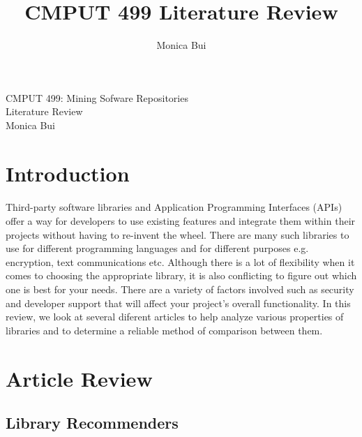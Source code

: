 \documentclass[12pt]{article}
\title{CMPUT 499 Literature Review}
\author{Monica Bui}
\begin{document}
\begin{titlepage}
    \centering
    \large
    \vspace{1cm}
    CMPUT 499: Mining Sofware Repositories \\
    \vspace{1cm}
    Literature Review \\
    \vspace{1cm}
    Monica Bui
\end{titlepage}



\newpage
\section{Introduction}

\paragraph{}
Third-party software libraries and Application Programming Interfaces (APIs) offer a way for developers
to use existing features and integrate them within their projects without having to re-invent the wheel.
There are many such libraries to use for different programming languages and for different purposes e.g. encryption, text communications etc.
Although there is a lot of flexibility when it comes to choosing the appropriate library,
it is also conflicting to figure out which one is best for your needs. 
There are a variety of factors involved such as security and developer support that will affect your project's overall functionality.
In this review, we look at several diferent articles to help analyze various properties of libraries and 
to determine a reliable method of comparison between them.

\section{Article Review}


\subsection{Library Recommenders}
\end{document}
